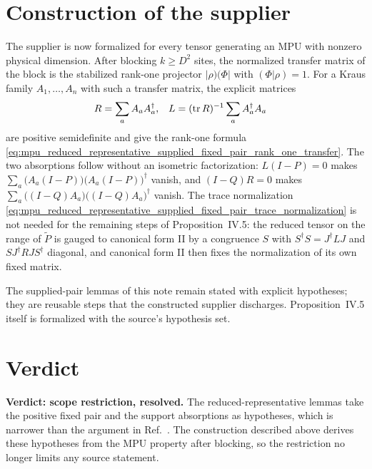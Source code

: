 \documentclass{article}
\begin{document}
\section{Construction of the supplier}

The supplier is now formalized for every tensor generating an MPU with
nonzero physical dimension. After blocking $k\geq D^2$ sites, the normalized
transfer matrix of the block is the stabilized rank-one projector
$|\rho)(\Phi|$ with $(\Phi|\rho)=1$. For a Kraus family
$A_1,\dots,A_n$ with such a transfer matrix, the explicit matrices
\begin{align}
    R &= \sum_a A_aA_a^\dagger, &
    L &= (\operatorname{tr} R)^{-1}\sum_a A_a^\dagger A_a
    \label{eq:mpu_reduced_representative_supplied_fixed_pair_1}
\end{align}
are positive semidefinite and give the rank-one formula
\eqref{eq:mpu_reduced_representative_supplied_fixed_pair_rank_one_transfer}.
The two absorptions follow without an isometric factorization: $L(I-P)=0$
makes $\sum_a\bigl(A_a(I-P)\bigr)\bigl(A_a(I-P)\bigr)^\dagger$ vanish, and
$(I-Q)R=0$ makes $\sum_a\bigl((I-Q)A_a\bigr)\bigl((I-Q)A_a\bigr)^\dagger$
vanish. The trace normalization
\eqref{eq:mpu_reduced_representative_supplied_fixed_pair_trace_normalization}
is not needed for the remaining steps of Proposition~IV.5: the reduced
tensor on the range of $\widetilde P$ is gauged to canonical form II by a
congruence $S$ with $S^\dagger S=J^\dagger LJ$ and $SJ^\dagger RJS^\dagger$
diagonal, and canonical form II then fixes the normalization of its own fixed
matrix.

The supplied-pair lemmas of this note remain stated with explicit
hypotheses; they are reusable steps that the constructed supplier
discharges. Proposition~IV.5 itself is formalized with the source's
hypothesis set.

\section{Verdict}

\textbf{Verdict: scope restriction, resolved.} The reduced-representative
lemmas take the positive fixed pair and the support absorptions as
hypotheses, which is narrower than the argument in
Ref.~\cite{Cirac2017MPU}. The construction described above derives these
hypotheses from the MPU property after blocking, so the restriction no longer
limits any source statement.



\end{document}
